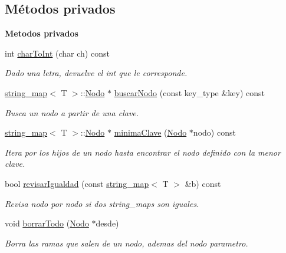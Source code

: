 \subsection*{Métodos privados}
\begin{Indent}{\bf Metodos privados}\par
\begin{DoxyCompactItemize}
\item 
int \hyperlink{classstring__map_a8e12bfe4444321c6147f3b7b20c68c05}{char\+To\+Int} (char ch) const 
\begin{DoxyCompactList}\small\item\em Dado una letra, devuelve el int que le corresponde. \end{DoxyCompactList}\item 
\hyperlink{classstring__map}{string\+\_\+map}$<$ T $>$\+::\hyperlink{structstring__map_1_1Nodo}{Nodo} $\ast$ \hyperlink{classstring__map_af0d19588b3448ed088725fb3163fc00b}{buscar\+Nodo} (const key\+\_\+type \&key) const 
\begin{DoxyCompactList}\small\item\em Busca un nodo a partir de una clave. \end{DoxyCompactList}\item 
\hyperlink{classstring__map}{string\+\_\+map}$<$ T $>$\+::\hyperlink{structstring__map_1_1Nodo}{Nodo} $\ast$ \hyperlink{classstring__map_aca26db2736ab8426cea28b96b6079994}{minima\+Clave} (\hyperlink{structstring__map_1_1Nodo}{Nodo} $\ast$nodo) const 
\begin{DoxyCompactList}\small\item\em Itera por los hijos de un nodo hasta encontrar el nodo definido con la menor clave. \end{DoxyCompactList}\item 
bool \hyperlink{classstring__map_a425afd1135cdb0109c5b44f5d0161479}{revisar\+Igualdad} (const \hyperlink{classstring__map}{string\+\_\+map}$<$ T $>$ \&b) const 
\begin{DoxyCompactList}\small\item\em Revisa nodo por nodo si dos string\+\_\+maps son iguales. \end{DoxyCompactList}\item 
void \hyperlink{classstring__map_aec7806190feff7f4ff14679c92ae8cea}{borrar\+Todo} (\hyperlink{structstring__map_1_1Nodo}{Nodo} $\ast$desde)
\begin{DoxyCompactList}\small\item\em Borra las ramas que salen de un nodo, ademas del nodo parametro. \end{DoxyCompactList}\item 

\end{DoxyCompactItemize}
\end{Indent}
